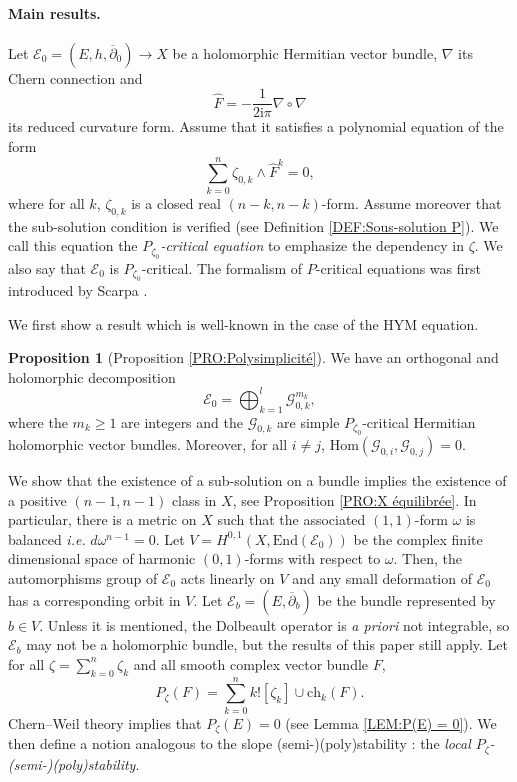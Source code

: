 \documentclass{article}
\theoremstyle{remark}
\theoremstyle{definition}
\newtheorem{propositionIntro}[theoremIntro]{Proposition}
\newcommand{\Hom}{\mathrm{Hom}}
\newcommand{\End}{\mathrm{End}}
\renewcommand{\i}{\boldsymbol{\mathrm{i}}}
\newcommand{\E}{\mathcal{E}}
\newcommand{\G}{\mathcal{G}}
\newcommand{\dbar}{\overline{\partial}}
\newcommand{\ch}{\mathrm{ch}}
\renewcommand{\geq}{\geqslant}
\begin{document}
\paragraph{Main results.}

Let $\E_0 = (E,h,\dbar_0) \rightarrow X$ be a holomorphic Hermitian vector bundle, $\nabla$ its Chern connection and
$$
\hat{F} = -\frac{1}{2\i\pi}\nabla \circ \nabla
$$
its reduced curvature form. Assume that it satisfies a polynomial equation of the form
$$
\sum_{k = 0}^n \zeta_{0,k} \wedge \hat{F}^k = 0,
$$
where for all $k$, $\zeta_{0,k}$ is a closed real $(n - k,n - k)$-form. Assume moreover that the sub-solution condition is verified (see Definition \ref{DEF:Sous-solution P}). We call this equation the \textit{$P_{\zeta_0}$-critical equation} to emphasize the dependency in $\zeta$. We also say that $\E_0$ is $P_{\zeta_0}$-critical. The formalism of $P$-critical equations was first introduced by Scarpa \cite[Sub-section 1.1]{DNST}.

We first show a result which is well-known in the case of the HYM equation.

\begin{propositionIntro}[Proposition \ref{PRO:Polysimplicité}]\label{PRO:1}
    We have an orthogonal and holomorphic decomposition
    $$
    \E_0 = \bigoplus_{k = 1}^l \G_{0,k}^{m_k},
    $$
    where the $m_k \geq 1$ are integers and the $\G_{0,k}$ are simple $P_{\zeta_0}$-critical Hermitian holomorphic vector bundles. Moreover, for all $i \neq j$, $\Hom(\G_{0,i},\G_{0,j}) = 0$.
\end{propositionIntro}

We show that the existence of a sub-solution on a bundle implies the existence of a positive $(n - 1,n - 1)$ class in $X$, see Proposition \ref{PRO:X équilibrée}. In particular, there is a metric on $X$ such that the associated $(1,1)$-form $\omega$ is balanced \textit{i.e.} $d\omega^{n - 1} = 0$. Let $V = H^{0,1}(X,\End(\E_0))$ be the complex finite dimensional space of harmonic $(0,1)$-forms with respect to $\omega$. Then, the automorphisms group of $\E_0$ acts linearly on $V$ and any small deformation of $\E_0$ has a corresponding orbit in $V$. Let $\E_b = (E,\dbar_b)$ be the bundle represented by $b \in V$. Unless it is mentioned, the Dolbeault operator is \textit{a priori} not integrable, so $\E_b$ may not be a holomorphic bundle, but the results of this paper still apply. Let for all $\zeta = \sum_{k = 0}^n \zeta_k$ and all smooth complex vector bundle $F$,
$$
P_\zeta(F) = \sum_{k = 0}^n k![\zeta_k] \cup \ch_k(F).
$$
Chern--Weil theory implies that $P_\zeta(E) = 0$ (see Lemma \ref{LEM:P(E) = 0}). We then define a notion analogous to the slope (semi-)(poly)stability : the \textit{local $P_\zeta$-(semi-)(poly)stability}.
\end{document}
